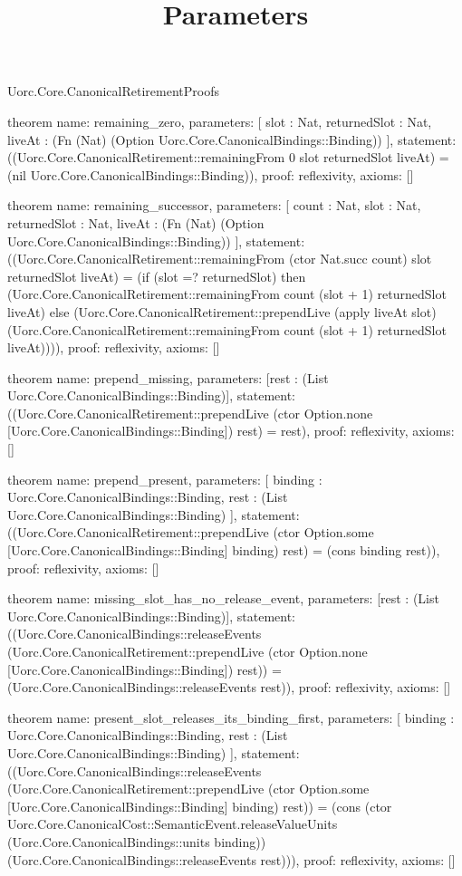 \begin{lexlean}{Uorc.Core.CanonicalRetirementProofs}
\title{Parameters}
\begin{semanticmodule}
theorem{
  name: remaining_zero,
  parameters: [
    slot : Nat,
    returnedSlot : Nat,
    liveAt : (Fn (Nat) (Option Uorc.Core.CanonicalBindings::Binding))
  ],
  statement: ((Uorc.Core.CanonicalRetirement::remainingFrom 0 slot returnedSlot liveAt) = (nil Uorc.Core.CanonicalBindings::Binding)),
  proof: reflexivity{},
  axioms: []
}

theorem{
  name: remaining_successor,
  parameters: [
    count : Nat,
    slot : Nat,
    returnedSlot : Nat,
    liveAt : (Fn (Nat) (Option Uorc.Core.CanonicalBindings::Binding))
  ],
  statement: ((Uorc.Core.CanonicalRetirement::remainingFrom (ctor Nat.succ count) slot returnedSlot liveAt) = (if (slot =? returnedSlot) then (Uorc.Core.CanonicalRetirement::remainingFrom count (slot + 1) returnedSlot liveAt) else (Uorc.Core.CanonicalRetirement::prependLive (apply liveAt slot) (Uorc.Core.CanonicalRetirement::remainingFrom count (slot + 1) returnedSlot liveAt)))),
  proof: reflexivity{},
  axioms: []
}

theorem{
  name: prepend_missing,
  parameters: [rest : (List Uorc.Core.CanonicalBindings::Binding)],
  statement: ((Uorc.Core.CanonicalRetirement::prependLive (ctor Option.none [Uorc.Core.CanonicalBindings::Binding]) rest) = rest),
  proof: reflexivity{},
  axioms: []
}

theorem{
  name: prepend_present,
  parameters: [
    binding : Uorc.Core.CanonicalBindings::Binding,
    rest : (List Uorc.Core.CanonicalBindings::Binding)
  ],
  statement: ((Uorc.Core.CanonicalRetirement::prependLive (ctor Option.some [Uorc.Core.CanonicalBindings::Binding] binding) rest) = (cons binding rest)),
  proof: reflexivity{},
  axioms: []
}

theorem{
  name: missing_slot_has_no_release_event,
  parameters: [rest : (List Uorc.Core.CanonicalBindings::Binding)],
  statement: ((Uorc.Core.CanonicalBindings::releaseEvents (Uorc.Core.CanonicalRetirement::prependLive (ctor Option.none [Uorc.Core.CanonicalBindings::Binding]) rest)) = (Uorc.Core.CanonicalBindings::releaseEvents rest)),
  proof: reflexivity{},
  axioms: []
}

theorem{
  name: present_slot_releases_its_binding_first,
  parameters: [
    binding : Uorc.Core.CanonicalBindings::Binding,
    rest : (List Uorc.Core.CanonicalBindings::Binding)
  ],
  statement: ((Uorc.Core.CanonicalBindings::releaseEvents (Uorc.Core.CanonicalRetirement::prependLive (ctor Option.some [Uorc.Core.CanonicalBindings::Binding] binding) rest)) = (cons (ctor Uorc.Core.CanonicalCost::SemanticEvent.releaseValueUnits (Uorc.Core.CanonicalBindings::units binding)) (Uorc.Core.CanonicalBindings::releaseEvents rest))),
  proof: reflexivity{},
  axioms: []
}


\end{semanticmodule}
\end{lexlean}
